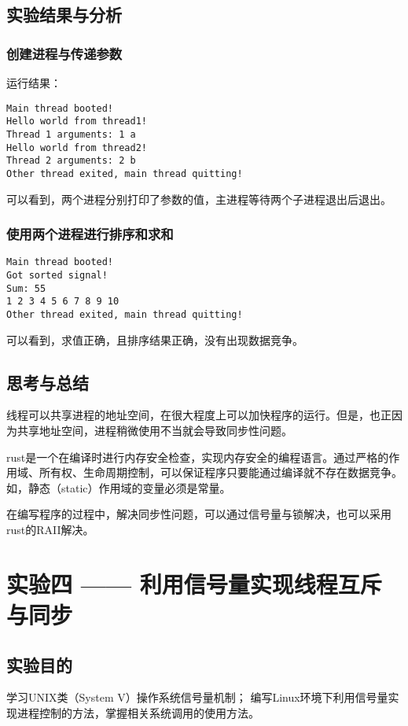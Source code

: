 \documentclass{ctexrep}
\begin{document}
\section{实验结果与分析}

\subsection{创建进程与传递参数}

运行结果：
\begin{verbatim}
Main thread booted!
Hello world from thread1!
Thread 1 arguments: 1 a
Hello world from thread2!
Thread 2 arguments: 2 b
Other thread exited, main thread quitting!
\end{verbatim}

可以看到，两个进程分别打印了参数的值，主进程等待两个子进程退出后退出。

\subsection{使用两个进程进行排序和求和}

\begin{verbatim}
Main thread booted!
Got sorted signal!
Sum: 55
1 2 3 4 5 6 7 8 9 10 
Other thread exited, main thread quitting!
\end{verbatim}

可以看到，求值正确，且排序结果正确，没有出现数据竞争。

\section{思考与总结}

线程可以共享进程的地址空间，在很大程度上可以加快程序的运行。但是，也正因为共享地址空间，进程稍微使用不当就会导致同步性问题。

rust是一个在编译时进行内存安全检查，实现内存安全的编程语言。通过严格的作用域、所有权、生命周期控制，可以保证程序只要能通过编译就不存在数据竞争。如，静态（static）作用域的变量必须是常量。

在编写程序的过程中，解决同步性问题，可以通过信号量与锁解决，也可以采用rust的RAII解决。

\chapter{实验四 —— 利用信号量实现线程互斥与同步}
\section{实验目的}
\begin{outline}[cenumerate]
    \1 学习UNIX类（System V）操作系统信号量机制；
    \1 编写Linux环境下利用信号量实现进程控制的方法，掌握相关系统调用的使用方法。
\end{outline}
\end{document}
